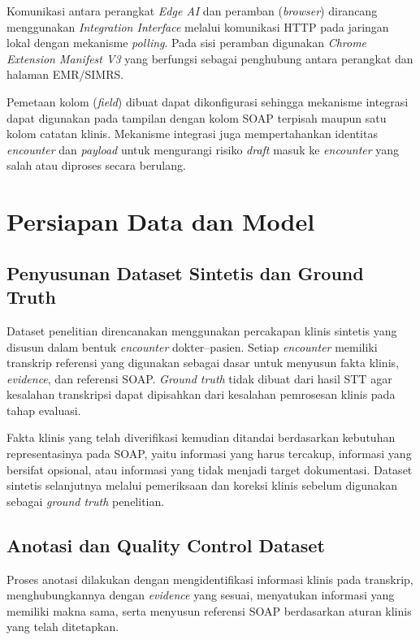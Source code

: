 Komunikasi antara perangkat \emph{Edge AI} dan peramban (\emph{browser}) dirancang menggunakan \emph{Integration Interface} melalui komunikasi HTTP pada jaringan lokal dengan mekanisme \emph{polling}. Pada sisi peramban digunakan \emph{Chrome Extension Manifest V3} yang berfungsi sebagai penghubung antara perangkat dan halaman EMR/SIMRS.

Pemetaan kolom (\emph{field}) dibuat dapat dikonfigurasi sehingga mekanisme integrasi dapat digunakan pada tampilan dengan kolom SOAP terpisah maupun satu kolom catatan klinis. Mekanisme integrasi juga mempertahankan identitas \emph{encounter} dan \emph{payload} untuk mengurangi risiko \emph{draft} masuk ke \emph{encounter} yang salah atau diproses secara berulang.

\section{Persiapan Data dan Model}
\label{sec:persiapandata}

\subsection{Penyusunan Dataset Sintetis dan Ground Truth}
\label{subsec:datasetsintetis}

Dataset penelitian direncanakan menggunakan percakapan klinis sintetis yang disusun dalam bentuk \emph{encounter} dokter--pasien. Setiap \emph{encounter} memiliki transkrip referensi yang digunakan sebagai dasar untuk menyusun fakta klinis, \emph{evidence}, dan referensi SOAP. \emph{Ground truth} tidak dibuat dari hasil STT agar kesalahan transkripsi dapat dipisahkan dari kesalahan pemrosesan klinis pada tahap evaluasi.

Fakta klinis yang telah diverifikasi kemudian ditandai berdasarkan kebutuhan representasinya pada SOAP, yaitu informasi yang harus tercakup, informasi yang bersifat opsional, atau informasi yang tidak menjadi target dokumentasi. Dataset sintetis selanjutnya melalui pemeriksaan dan koreksi klinis sebelum digunakan sebagai \emph{ground truth} penelitian.

\subsection{Anotasi dan Quality Control Dataset}
\label{subsec:annotationqc}

Proses anotasi dilakukan dengan mengidentifikasi informasi klinis pada transkrip, menghubungkannya dengan \emph{evidence} yang sesuai, menyatukan informasi yang memiliki makna sama, serta menyusun referensi SOAP berdasarkan aturan klinis yang telah ditetapkan.

